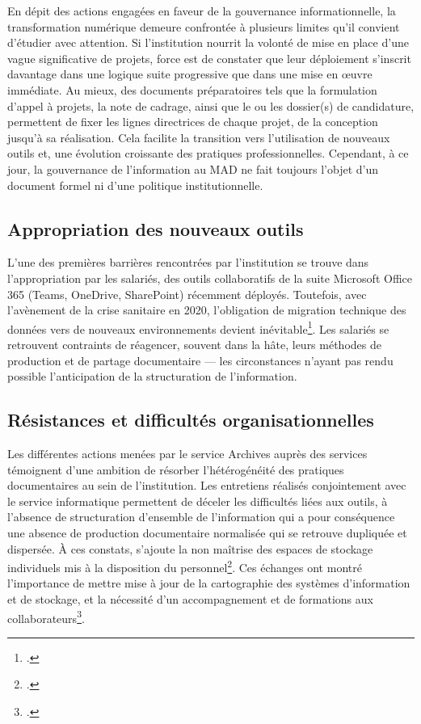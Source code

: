 En dépit des actions engagées en faveur de la gouvernance informationnelle, la transformation numérique demeure confrontée à plusieurs limites qu’il convient d’étudier avec attention. Si l'institution nourrit la volonté de mise en place d’une vague significative de projets, force est de constater que leur déploiement s’inscrit davantage dans une logique suite progressive que dans une mise en œuvre immédiate. Au mieux, des documents préparatoires tels que la formulation d’appel à projets, la note de cadrage, ainsi que le ou les dossier(s) de candidature, permettent de fixer les lignes directrices de chaque projet, de la conception jusqu’à sa réalisation. Cela facilite la transition vers l’utilisation de nouveaux outils et, une évolution croissante des pratiques professionnelles. Cependant, à ce jour, la gouvernance de l’information au MAD ne fait toujours l’objet d’un document formel ni d’une politique institutionnelle. 


\subsection*{Appropriation des nouveaux outils}

L’une des premières barrières rencontrées par l’institution se trouve dans l’appropriation par les salariés, des outils collaboratifs de la suite Microsoft Office 365 (Teams, OneDrive, SharePoint) récemment déployés. Toutefois, avec l’avènement de la crise sanitaire en 2020, l’obligation de migration technique des données vers de nouveaux environnements devient inévitable\footcite[version 4, p.~3]{bomel-dion-note-cadrage}. Les salariés se retrouvent contraints de réagencer, souvent dans la hâte, leurs méthodes de production et de partage documentaire — les circonstances n’ayant pas rendu possible l’anticipation de la  structuration de l’information.


\subsection*{Résistances et difficultés organisationnelles }

Les différentes actions menées par le service Archives auprès des services témoignent d’une ambition de résorber l’hétérogénéité des pratiques documentaires au sein de l’institution. Les entretiens réalisés conjointement avec le service informatique permettent de déceler les difficultés liées aux outils, à l’absence de structuration d’ensemble de l’information qui a pour conséquence une absence de production documentaire normalisée qui se retrouve dupliquée et dispersée. À ces constats, s’ajoute la non maîtrise des espaces de stockage individuels mis à la disposition du personnel\footcite[version 4, p.~4]{bomel-dion-note-cadrage}. Ces échanges ont montré l’importance de mettre mise à jour de la cartographie des systèmes d’information et de stockage, et la nécessité d’un accompagnement et de formations aux collaborateurs\footcite[version 4, p.~4]{bomel-dion-note-cadrage}. 

